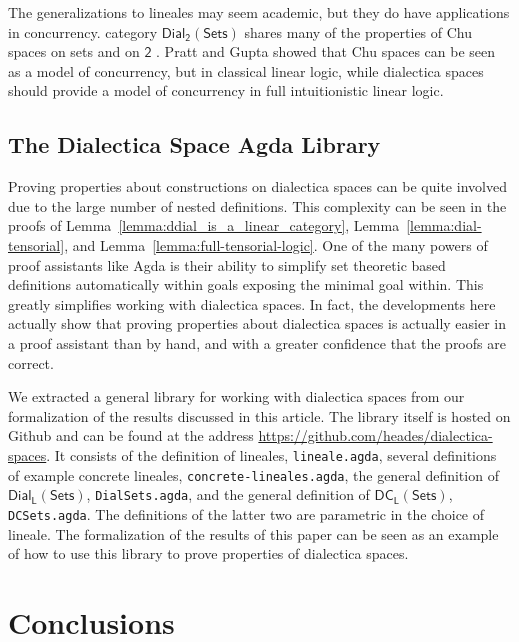 \documentclass[preprint,6pt]{elsarticle}
\newcommand{\dial}[0]{\mathsf{Dial_2}(\mathsf{Sets})}
\newcommand{\dialSets}[1]{\mathsf{Dial_{#1}}(\mathsf{Sets})}
\newcommand{\dcSets}[1]{\mathsf{DC_{#1}}(\mathsf{Sets})}
\begin{document}
The generalizations to lineales may seem academic, but they do have
applications in concurrency.  %
category $\dial$ shares many of the properties of Chu spaces on sets
and on $\mathsf{2}$ \cite{dePaiva:2007}.  Pratt and Gupta
\cite{Gupta:1994} showed that Chu spaces can be seen as a model of
concurrency, but in classical linear logic, while dialectica spaces
should provide a model of concurrency in full intuitionistic linear
logic.

\subsection{The Dialectica Space Agda Library}
\label{subsec:the_dialectica_space_agda_library}
Proving properties about constructions on dialectica spaces can be
quite involved due to the large number of nested definitions.  This
complexity can be seen in the proofs of
Lemma~\ref{lemma:ddial_is_a_linear_category},
Lemma~\ref{lemma:dial-tensorial}, and
Lemma~\ref{lemma:full-tensorial-logic}.  One of the many powers of
proof assistants like Agda is their ability to simplify set theoretic
based definitions automatically within goals exposing the minimal goal
within.  This greatly simplifies working with dialectica spaces.  In
fact, the developments here actually show that proving properties
about dialectica spaces is actually easier in a proof assistant than
by hand, and with a greater confidence that the proofs are correct.

We extracted a general library for working with dialectica spaces from
our formalization of the results discussed in this article. The
library itself is hosted on Github and can be found at the address
\url{https://github.com/heades/dialectica-spaces}.  It consists of the
definition of lineales, \verb!lineale.agda!, several definitions of
example concrete lineales,
\verb!concrete-lineales.agda!, the general
definition of $\dialSets{L}$, \verb!DialSets.agda!, and the general
definition of $\dcSets{L}$, \verb!DCSets.agda!. The definitions of the
latter two are parametric in the choice of lineale.  The formalization
of the results of this paper can be seen as an example of how to use
this library to prove properties of dialectica spaces.

\section{Conclusions
}
\label{sec:conclusion_and_future_work}
\end{document}
